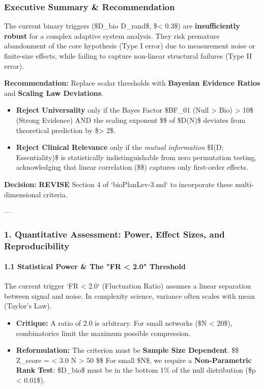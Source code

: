\documentclass{article}
\begin{document}
\subsubsection{Executive Summary \& Recommendation}

The current binary triggers (\$D\_{bio} \approx D\_{rand}\$, \$\rho < 0.3\$) are \textbf{insufficiently robust} for a complex adaptive system analysis. They risk premature abandonment of the core hypothesis (Type I error) due to measurement noise or finite-size effects, while failing to capture non-linear structural failures (Type II error).

\textbf{Recommendation:} Replace scalar thresholds with \textbf{Bayesian Evidence Ratios} and \textbf{Scaling Law Deviations}.
\begin{itemize}
\item   \textbf{Reject Universality} only if the Bayes Factor \$BF\_{01} (Null > Bio) > 10\$ (Strong Evidence) AND the scaling exponent \$\gamma\$ of \$D(N)\$ deviates from theoretical prediction by \$> 2\sigma\$.
\item   \textbf{Reject Clinical Relevance} only if the \textit{mutual information} \$I(\Delta D; Essentiality)\$ is statistically indistinguishable from zero permutation testing, acknowledging that linear correlation (\$\rho\$) captures only first-order effects.
\end{itemize}

\textbf{Decision:} \textbf{REVISE} Section 4 of `bioPlanLev-3.md` to incorporate these multi-dimensional criteria.

---

\subsubsection{1. Quantitative Assessment: Power, Effect Sizes, and Reproducibility}

\paragraph{1.1 Statistical Power \& The "FR < 2.0" Threshold}
The current trigger `FR < 2.0` (Fluctuation Ratio) assumes a linear separation between signal and noise. In complexity science, variance often scales with mean (Taylor's Law).
\begin{itemize}
\item   \textbf{Critique:} A ratio of 2.0 is arbitrary. For small networks (\$N < 20\$), combinatorics limit the maximum possible compression.
\item   \textbf{Reformulation:} The criterion must be \textbf{Sample Size Dependent}.
    \$\$ Z\_{score} =  < 3.0 \quad {} N > 50 \text{)} \$\$
    For small \$N\$, we require a \textbf{Non-Parametric Rank Test}: \$D\_{bio}\$ must be in the bottom 1\% of the null distribution (\$p < 0.01\$).
\end{itemize}
\end{document}
